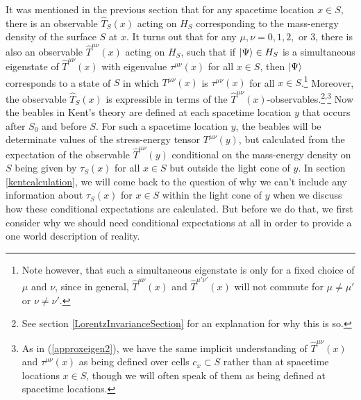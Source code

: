 It was mentioned in the previous section that for any spacetime location $x\in S$,  there is an observable $\hat{T}_S(x)$ acting on $H_S$ corresponding to the mass-energy density of the surface $S$ at $x$. It turns out that for any $\mu, \nu=0,1,2,$ or $3$, there is also an observable  $\hat{T}^{\mu\nu}(x)$ acting on $H_S$, such that if $\ket{\Psi}\in H_S$ is a simultaneous eigenstate of $\hat{T}^{\mu\nu}(x)$ with eigenvalue $\tau^{\mu\nu}(x)$ for all $x\in S$, then $\ket{\Psi}$ corresponds to a state of $S$ in which $T^{\mu\nu}(x)$ is  $\tau^{\mu\nu}(x)$ for all $x\in S$.\footnote{Note however, that such a simultaneous eigenstate is only for a fixed choice of $\mu$ and $\nu$, since in general, $\hat{T}^{\mu\nu}(x)$ and $\hat{T}^{\mu'\nu'}(x)$ will not commute for $\mu\neq\mu'$ or $\nu\neq\nu'$. } Moreover, the observable $\hat{T}_S(x)$ is expressible in terms of the  $\hat{T}^{\mu\nu}(x)$-observables.\footnote{See section  \ref{LorentzInvarianceSection} for an explanation for why this is so.}\textsuperscript{,}\footnote{As in (\ref{approxeigen2}), we have the same implicit understanding of $\hat{T}^{\mu\nu}(x)$ and $\tau^{\mu\nu}(x)$ as being defined over cells $c_x\subset S$ rather than at spacetime locations $x\in S$, though we will often speak of them as being defined at spacetime locations. }
Now the  beables in Kent's theory are defined at each spacetime location $y$ that occurs after $S_0$ and before $S$. For such a spacetime location $y$, the beables will be determinate values of the stress-energy tensor $T^{\mu\nu}(y)$, but calculated from the expectation of the observable $\hat{T}^{\mu\nu}(y)$ conditional on the mass-energy density on $S$ being given by $\tau_S(x)$ for all $x\in S$ but outside the light cone of $y$. In section \ref{kentcalculation}, we will come back to the question of why we can't include any information about $\tau_S(x)$ for $x\in S$ within the light cone of $y$ when we discuss how these conditional expectations are calculated. But before we do that, we first consider why we should need conditional expectations at all in order to provide a one world description of reality.


